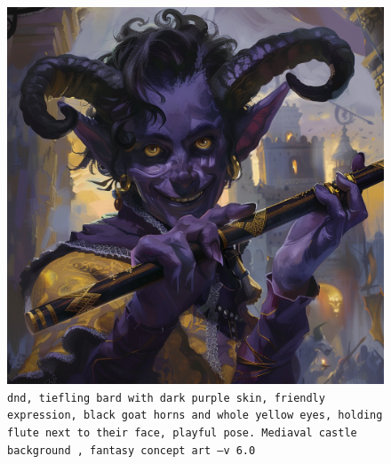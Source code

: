 \begin{figure}[h]
    \centering
    \includegraphics[width=\textwidth]{resources/figures/demonkin-bard.png}
    \caption{\texttt{dnd, tiefling bard with dark purple skin, friendly expression, black goat horns and whole yellow eyes, holding flute next to their face, playful pose. Mediaval castle background , fantasy concept art --v 6.0}}
    \label{fig:demonkin-bard}
\end{figure}